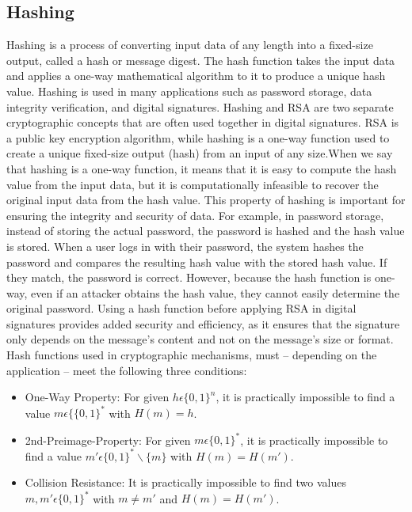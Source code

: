 \subsection*{Hashing}
Hashing is a process of converting input data of any length into a fixed-size output, called a hash or message digest.
The hash function takes the input data and applies a one-way mathematical algorithm to it to produce a unique hash value.
Hashing is used in many applications such as password storage, data integrity verification, and digital signatures.
Hashing and RSA are two separate cryptographic concepts that are often used together in digital signatures. RSA is a public key encryption algorithm,
while hashing is a one-way function used to create a unique fixed-size output (hash) from an input of any size.When we say that hashing is a one-way function,
it means that it is easy to compute the hash value from the input data, but it is computationally infeasible to recover the original input data from the hash value.
This property of hashing is important for ensuring the integrity and security of data. For example, in password storage, instead of storing the actual password, the password is hashed and the hash value is stored.
When a user logs in with their password, the system hashes the password and compares the resulting hash value with the stored hash value. If they match, the password is correct.
However, because the hash function is one-way, even if an attacker obtains the hash value, they cannot easily determine the original password.
Using a hash function before applying RSA in digital signatures provides added security and efficiency, as it ensures that the signature only depends on the message's content and not on the message's size or format.
Hash functions used in cryptographic mechanisms, must – depending on the application – meet
the following three conditions:
\vspace{-18pt}
\begin{itemize}
	\item One-Way Property: For given $h\epsilon \{0,1\}^n$, it is practically impossible to find a value $m \epsilon \{\{0, 1\}^*$ with $H(m) = h$.
	\item 2nd-Preimage-Property: For given $m \epsilon \{0, 1\}^*$, it is practically impossible to find a value $m' \epsilon \{0, 1\}^*\backslash\{m\}$ with $H(m) = H(m')$.
	\item Collision Resistance: It is practically impossible to find two values $m, m' \epsilon \{0, 1\}^*$ with $m \neq  m'$ and $H(m) = H(m')$.
\end{itemize}
